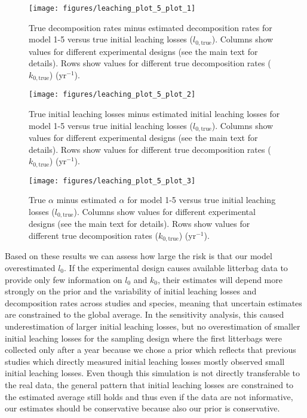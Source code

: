 \documentclass[
  12pt,
]{article}
\begin{document}
\begin{figure}[H]

{\centering \texttt{[image: figures/leaching\_plot\_5\_plot\_1]} 

}

\caption{True decomposition rates minus estimated decomposition rates for model 1-5 versus true initial leaching losses (\(l_{0,\text{true}}\)). Columns show values for different experimental designs (see the main text for details). Rows show values for different true decomposition rates (\(k_{0,\text{true}}\)) (yr\(^{-1}\)).}\label{fig:leaching-sup-plot-5-1}
\end{figure}
\begin{figure}[H]

{\centering \texttt{[image: figures/leaching\_plot\_5\_plot\_2]} 

}

\caption{True initial leaching losses minus estimated initial leaching losses for model 1-5 versus true initial leaching losses (\(l_{0,\text{true}}\)). Columns show values for different experimental designs (see the main text for details). Rows show values for different true decomposition rates (\(k_{0,\text{true}}\)) (yr\(^{-1}\)).}\label{fig:leaching-sup-plot-5-2}
\end{figure}
\begin{figure}[H]

{\centering \texttt{[image: figures/leaching\_plot\_5\_plot\_3]} 

}

\caption{True \(\alpha\) minus estimated \(\alpha\) for model 1-5 versus true initial leaching losses (\(l_{0,\text{true}}\)). Columns show values for different experimental designs (see the main text for details). Rows show values for different true decomposition rates (\(k_{0,\text{true}}\)) (yr\(^{-1}\)).}\label{fig:leaching-sup-plot-5-3}
\end{figure}

Based on these results we can assess how large the risk is that our model overestimated \(l_0\). If the experimental design causes available litterbag data to provide only few information on \(l_0\) and \(k_0\), their estimates will depend more strongly on the prior and the variability of initial leaching losses and decomposition rates across studies and species, meaning that uncertain estimates are constrained to the global average. In the sensitivity analysis, this caused underestimation of larger initial leaching losses, but no overestimation of smaller initial leaching losses for the sampling design where the first litterbags were collected only after a year because we chose a prior which reflects that previous studies which directly measured initial leaching losses mostly observed small initial leaching losses. Even though this simulation is not directly transferable to the real data, the general pattern that initial leaching losses are constrained to the estimated average still holds and thus even if the data are not informative, our estimates should be conservative because also our prior is conservative.
\end{document}
